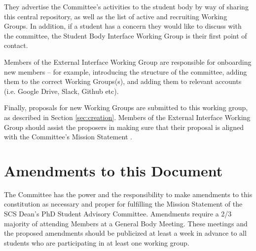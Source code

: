 \documentclass{article}
\begin{document}
They advertise the Committee's activities to the student body by way of sharing this central repository, as well as the list of active and recruiting Working Groups. In addition, if a student has a concern they would like to discuss with the committee, the Student Body Interface Working Group is their first point of contact.

Members of the External Interface Working Group are responsible for onboarding new members -- for example, introducing the structure of the committee, adding them to the correct Working Groups(s), and adding them to relevant accounts (i.e. Google Drive, Slack, Github etc).

Finally, proposals for new Working Groups are submitted to this working group, as described in Section \ref{sec:creation}. Members of the External Interface Working Group should assist the proposers in making sure that their proposal is aligned with the Committee's Mission Statement .


\section{Amendments to this Document}
The Committee has the power and the responsibility to make amendments to this constitution as necessary and proper for fulfilling the Mission Statement of the SCS Dean's PhD Student Advisory Committee. Amendments require a 2/3 majority of attending Members at a General Body Meeting. These meetings and the proposed amendments should be publicized at least a week in advance to all students who are participating in at least one working group. 
\end{document}
